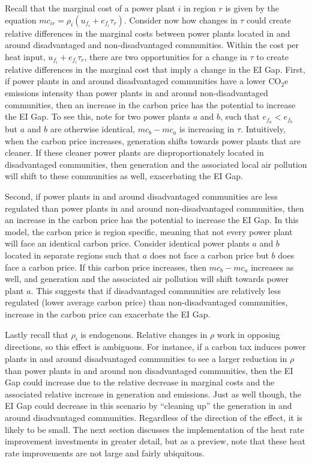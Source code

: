 Recall that the marginal cost of a power plant $i$ in region $r$ is given by the equation $mc_{ir} = \rho_i(u_{f_i} + e_{f_i} \tau_r)$. Consider now how changes in $\tau$ could create relative differences in the marginal costs between power plants located in and around disadvantaged and non-disadvantaged communities. Within the cost per heat input, $u_{f_i} + e_{f_i} \tau_r$, there are two opportunities for a change in $\tau$ to create relative differences in the marginal cost that imply a change in the EI Gap. First, if power plants in and around disadvantaged communities have a lower CO$_2$e emissions intensity than power plants in and around non-disadvantaged communities, then an increase in the carbon price has the potential to increase the EI Gap. To see this, note for two power plants $a$ and $b$, such that $e_{f_a} < e_{f_b}$ but $a$ and $b$ are otherwise identical, $mc_{b} - mc_a$ is increasing in $\tau$. Intuitively, when the carbon price increases, generation shifts towards power plants that are cleaner. If these cleaner power plants are disproportionately located in disadvantaged communities, then generation and the associated local air pollution will shift to these communities as well, exacerbating the EI Gap.

Second, if power plants in and around disadvantaged communities are less regulated than power plants in and around non-disadvantaged communities, then an increase in the carbon price has the potential to increase the EI Gap. In this model, the carbon price is region specific, meaning that not every power plant will face an identical carbon price. Consider identical power plants $a$ and $b$ located in separate regions such that $a$ does not face a carbon price but $b$ does face a carbon price. If this carbon price increases, then $mc_{b} - mc_a$ increases as well, and generation and the associated air pollution will shift towards power plant $a$. This suggests that if disadvantaged communities are relatively less regulated (lower average carbon price) than non-disadvantaged communities, increase in the carbon price can exacerbate the EI Gap.

Lastly recall that $\rho_i$ is endogenous. Relative changes in $\rho$ work in opposing directions, so this effect is ambiguous. For instance, if a carbon tax induces power plants in and around disadvantaged communities to see a larger reduction in $\rho$ than power plants in and around non disadvantaged communities, then the EI Gap could increase due to the relative decrease in marginal costs and the associated relative increase in generation and emissions. Just as well though, the EI Gap could decrease in this scenario by ``cleaning up'' the generation in and around disadvantaged communities. Regardless of the direction of the effect, it is likely to be small. The next section discusses the implementation of the heat rate improvement investments in greater detail, but as a preview, note that these heat rate improvements are not large and fairly ubiquitous. 

